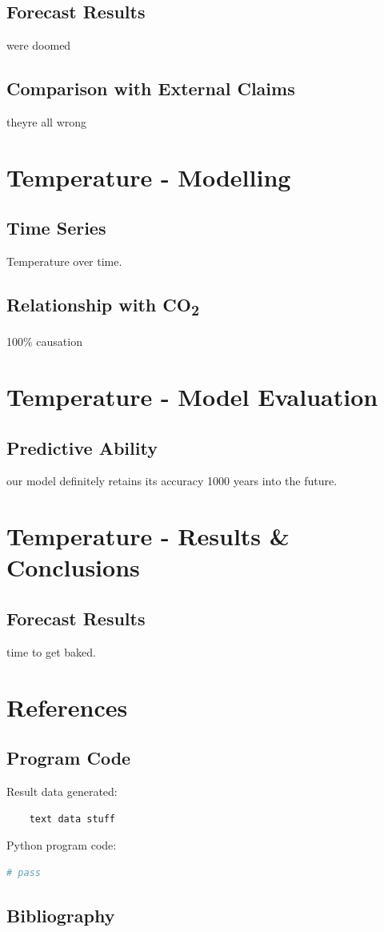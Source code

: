 \documentclass{mcmthesis}
\begin{document}
    \subsection{Forecast Results}
    we\textquotesingle re doomed

    \subsection{Comparison with External Claims}
    they\textquotesingle re all wrong


    \section{Temperature - Modelling}

    \subsection{Time Series}
    Temperature over time.

    \subsection{Relationship with CO\textsubscript{2}}
    100\% causation


    \section{Temperature - Model Evaluation}

    \subsection{Predictive Ability}
    our model definitely retains its accuracy 1000 years into the future.


    \section{Temperature - Results \& Conclusions}

    \subsection{Forecast Results}
    time to get baked.


    \section{References}

    \subsection{Program Code}
    \noindent Result data generated:
    \begin{verbatim}
    text data stuff

    \end{verbatim}

    \noindent Python program code:
    \begin{lstlisting}[language=Python]
        # pass

    \end{lstlisting}

    \subsection{Bibliography}
\end{document}
